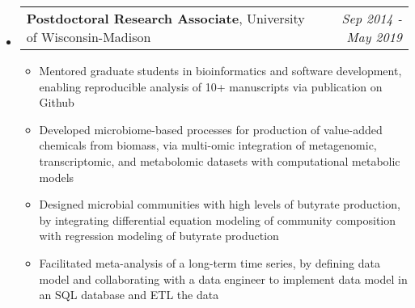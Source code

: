 \documentclass[letterpaper,10pt]{article}
\makeatletter
\newcommand{\ressubheadingSingular}[2]{
\begin{tabular*}{7in}{l@{\cftdotfill{\cftsecdotsep}\extracolsep{\fill}}r}
		#1 & \textit{#2} \\
\end{tabular*}\vspace{-6pt}}
\makeatother
\begin{document}
\begin{itemize}
	\item
		\ressubheadingSingular{\textbf{Postdoctoral Research Associate}, University of Wisconsin-Madison}{Sep 2014 - May 2019}
		\begin{itemize}
			\item Mentored graduate students in bioinformatics and software development, enabling reproducible analysis of 10+ manuscripts via publication on Github
			\item Developed microbiome-based processes for production of value-added chemicals from biomass, via multi-omic integration of metagenomic, transcriptomic, and metabolomic datasets with computational metabolic models
			\item Designed microbial communities with high levels of butyrate production, by integrating differential equation modeling of community composition with regression modeling of butyrate production
			\item Facilitated meta-analysis of a long-term time series, by defining data model and collaborating with a data engineer to implement data model in an SQL database and ETL the data

\end{itemize}
\end{itemize}
\end{document}
